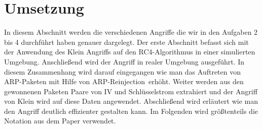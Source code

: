 \documentclass[10pt,a4paper]{article}
\begin{document}
\section{Umsetzung}
In diesem Abschnitt werden die verschiedenen Angriffe die wir in den Aufgaben 2 bis 4 durchführt haben genauer dargelegt. Der erste Abschnitt befasst sich mit der Anwendung des Klein Angriffs auf den RC4-Algorithmus in einer \glqq simulierten Umgebung\grqq . Anschließend wird der Angriff in realer Umgebung ausgeführt. In diesem Zusammenhang wird darauf eingegangen wie man das Auftreten von ARP-Paketen mit Hilfe von \glqq ARP-Reinjection\grqq\ erhöht. Weiter werden aus den gewonnenen Paketen Paare von IV und Schlüsselstrom extrahiert und der Angriff von Klein wird auf diese Daten angewendet. Abschließend wird erläutert wie man den Angriff deutlich effizienter gestalten kann. Im Folgenden wird größtenteils die Notation aus dem Paper \cite[Kapitel 3.1]{TWP07} verwendet.
\end{document}
